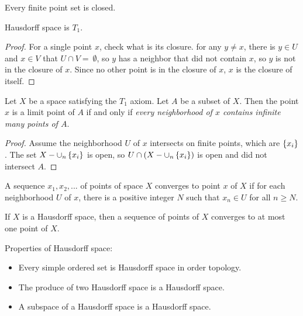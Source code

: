 \begin{definition}[\cindex{$T_1$}]
Every finite point set is closed.    
\end{definition}

\begin{theorem}
    Hausdorff space is $T_1$.
\end{theorem}
\begin{proof}
    For a single point $x$, check what is its closure. for any $y \neq x$, there is $y \in U$ and $x \in V$ that $U \cap V = \ \emptyset$, so $y$ has a neighbor that did not contain $x$, so $y$ is not in the closure of $x$. Since no other point is in the closure of $x$, $x$ is the closure of itself.
\end{proof}


\begin{theorem}
Let $X$ be a space satisfying the $T_1$ axiom. Let $A$ be a subset of $X$. Then the point $x$ is a limit point of $A$ if and only if \emph{every neighborhood of $x$ contains infinite many points of $A$}.
\end{theorem}
\begin{proof}
    Assume the neighborhood $U$ of $x$ intersects on finite points, which are $\set{x_i}$. The set $X - \cup_n \set{x_i}$ is open, so $U \cap (X - \cup_n \set{x_i})$ is open and did not intersect $A$.
\end{proof}


\begin{definition}
    A sequence $x_1, x_2, ... $ of points of space $X$ converges to point $x$ of $X$ if for each neighborhood $U$ of $x$, there is a positive integer $N$ such that $x_n \in U$ for all $n \geq N$.
\end{definition}

\begin{theorem}
If $X$ is a Hausdorff space, then a sequence of points of $X$ converges to at most one point of $X$.    
\end{theorem}

\begin{theorem}
Properties of Hausdorff space:
\begin{itemize}
    \item Every simple ordered set is Hausdorff space in order topology.
    \item The produce of two Hausdorff space is a Hausdorff space.
    \item A subspace of a Hausdorff space is a Hausdorff space. 
\end{itemize}
\end{theorem}



